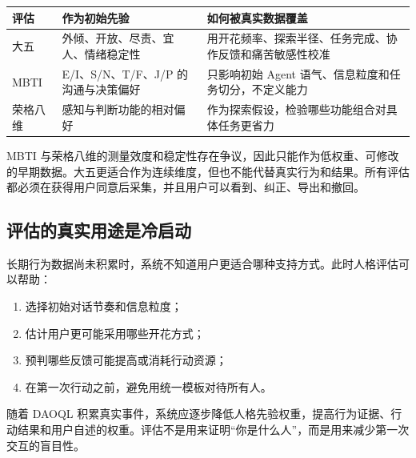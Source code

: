 \documentclass[UTF8,a4paper,11pt]{ctexart}
\begin{document}
\begin{center}
\begin{longtable}{@{}p{3.0cm}p{4.0cm}p{6.0cm}@{}}
\toprule
\textbf{评估} & \textbf{作为初始先验} & \textbf{如何被真实数据覆盖} \\
\midrule
大五 & 外倾、开放、尽责、宜人、情绪稳定性 & 用开花频率、探索半径、任务完成、协作反馈和痛苦敏感性校准 \\
MBTI & E/I、S/N、T/F、J/P 的沟通与决策偏好 & 只影响初始 Agent 语气、信息粒度和任务切分，不定义能力 \\
荣格八维 & 感知与判断功能的相对偏好 & 作为探索假设，检验哪些功能组合对具体任务更省力 \\
\bottomrule
\end{longtable}
\end{center}

MBTI 与荣格八维的测量效度和稳定性存在争议，因此只能作为低权重、可修改的早期数据。大五更适合作为连续维度，但也不能代替真实行为和结果。所有评估都必须在获得用户同意后采集，并且用户可以看到、纠正、导出和撤回。

\subsection{评估的真实用途是冷启动}

长期行为数据尚未积累时，系统不知道用户更适合哪种支持方式。此时人格评估可以帮助：

\begin{enumerate}
\item 选择初始对话节奏和信息粒度；
\item 估计用户更可能采用哪些开花方式；
\item 预判哪些反馈可能提高或消耗行动资源；
\item 在第一次行动之前，避免用统一模板对待所有人。
\end{enumerate}

随着 DAOQL 积累真实事件，系统应逐步降低人格先验权重，提高行为证据、行动结果和用户自述的权重。评估不是用来证明“你是什么人”，而是用来减少第一次交互的盲目性。
\end{document}
